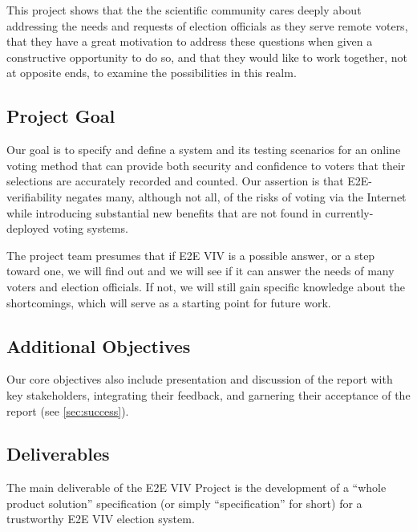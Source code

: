 This project shows that the the scientific community cares deeply
about addressing the needs and requests of election officials as they
serve remote voters, that they have a great motivation to address
these questions when given a constructive opportunity to do so, and
that they would like to work together, not at opposite ends, to
examine the possibilities in this realm.

\subsection{Project Goal}
\label{sec:project-goal}

Our goal is to specify and define a system and its testing scenarios
for an online voting method that can provide both security and
confidence to voters that their selections are accurately recorded and
counted. Our assertion is that E2E-verifiability negates many,
although not all, of the risks of voting via the Internet while
introducing substantial new benefits that are not found in
currently-deployed voting systems.

The project team presumes that if E2E VIV is a possible answer, or a
step toward one, we will find out and we will see if it can answer the
needs of many voters and election officials. If not, we will still
gain specific knowledge about the shortcomings, which will serve as a
starting point for future work.

\subsection{Additional Objectives}
\label{sec:addit-object}

Our core objectives also include presentation and discussion of the
report with key stakeholders, integrating their feedback, and
garnering their acceptance of the report (see \autoref{sec:success}).

\subsection{Deliverables}
\label{sec:deliverables}

The main deliverable of the E2E VIV Project is the development of a
``whole product solution'' specification (or simply ``specification''
for short) for a trustworthy E2E VIV election system.

